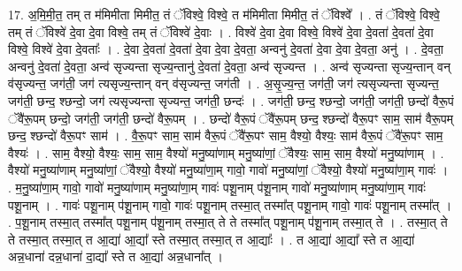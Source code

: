 \documentclass[17pt]{extarticle}
\begin{document}
17. अ॒मि॒मी॒त॒ तम् त म॑मिमीता मिमीत॒ तं ॅविश्वे॒ विश्वे॒ त म॑मिमीता मिमीत॒ तं ॅविश्वे᳚ । . तं ॅविश्वे॒ विश्वे॒ तम् तं ॅविश्वे॑ दे॒वा दे॒वा विश्वे॒ तम् तं ॅविश्वे॑ दे॒वाः । . विश्वे॑ दे॒वा दे॒वा विश्वे॒ विश्वे॑ दे॒वा दे॒वता॑ दे॒वता॑ दे॒वा विश्वे॒ विश्वे॑ दे॒वा दे॒वताः᳚ । . दे॒वा दे॒वता॑ दे॒वता॑ दे॒वा दे॒वा दे॒वता॒ अन्वनु॑ दे॒वता॑ दे॒वा दे॒वा दे॒वता॒ अनु॑ । . दे॒वता॒ अन्वनु॑ दे॒वता॑ दे॒वता॒ अन्व॑ सृज्यन्ता सृज्य॒न्तानु॑ दे॒वता॑ दे॒वता॒ अन्व॑ सृज्यन्त । . अन्व॑ सृज्यन्ता सृज्य॒न्तान् वन् व॑सृज्यन्त॒ जग॑ती॒ जग॑ त्यसृज्य॒न्तान् वन् व॑सृज्यन्त॒ जग॑ती । . अ॒सृ॒ज्य॒न्त॒ जग॑ती॒ जग॑ त्यसृज्यन्ता सृज्यन्त॒ जग॑ती॒ छन्द॒ श्छन्दो॒ जग॑ त्यसृज्यन्ता सृज्यन्त॒ जग॑ती॒ छन्दः॑ । . जग॑ती॒ छन्द॒ श्छन्दो॒ जग॑ती॒ जग॑ती॒ छन्दो॑ वैरू॒पं ॅवै॑रू॒पम् छन्दो॒ जग॑ती॒ जग॑ती॒ छन्दो॑ वैरू॒पम् । . छन्दो॑ वैरू॒पं ॅवै॑रू॒पम् छन्द॒ श्छन्दो॑ वैरू॒पꣳ साम॒ साम॑ वैरू॒पम् छन्द॒ श्छन्दो॑ वैरू॒पꣳ साम॑ । . वै॒रू॒पꣳ साम॒ साम॑ वैरू॒पं ॅवै॑रू॒पꣳ साम॒ वैश्यो॒ वैश्यः॒ साम॑ वैरू॒पं ॅवै॑रू॒पꣳ साम॒ वैश्यः॑ । . साम॒ वैश्यो॒ वैश्यः॒ साम॒ साम॒ वैश्यो॑ मनु॒ष्या॑णाम् मनु॒ष्या॑णां॒ ॅवैश्यः॒ साम॒ साम॒ वैश्यो॑ मनु॒ष्या॑णाम् । . वैश्यो॑ मनु॒ष्या॑णाम् मनु॒ष्या॑णां॒ ॅवैश्यो॒ वैश्यो॑ मनु॒ष्या॑णा॒म् गावो॒ गावो॑ मनु॒ष्या॑णां॒ ॅवैश्यो॒ वैश्यो॑ मनु॒ष्या॑णा॒म् गावः॑ । . म॒नु॒ष्या॑णा॒म् गावो॒ गावो॑ मनु॒ष्या॑णाम् मनु॒ष्या॑णा॒म् गावः॑ पशू॒नाम् प॑शू॒नाम् गावो॑ मनु॒ष्या॑णाम् मनु॒ष्या॑णा॒म् गावः॑ पशू॒नाम् । . गावः॑ पशू॒नाम् प॑शू॒नाम् गावो॒ गावः॑ पशू॒नाम् तस्मा॒त् तस्मा᳚त् पशू॒नाम् गावो॒ गावः॑ पशू॒नाम् तस्मा᳚त् । . प॒शू॒नाम् तस्मा॒त् तस्मा᳚त् पशू॒नाम् प॑शू॒नाम् तस्मा॒त् ते ते तस्मा᳚त् पशू॒नाम् प॑शू॒नाम् तस्मा॒त् ते । . तस्मा॒त् ते ते तस्मा॒त् तस्मा॒त् त आ॒द्या॑ आ॒द्या᳚ स्ते तस्मा॒त् तस्मा॒त् त आ॒द्याः᳚ । . त आ॒द्या॑ आ॒द्या᳚ स्ते त आ॒द्या॑ अन्न॒धाना॑ दन्न॒धाना॑ दा॒द्या᳚ स्ते त आ॒द्या॑ अन्न॒धाना᳚त् । \newline
\end{document}
